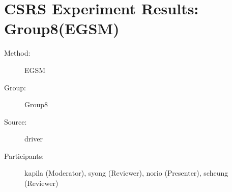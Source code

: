 \chapter {CSRS Experiment Results: Group8(EGSM)}
\small

\begin{description}
\item [Method:] EGSM
\item [Group:] Group8
\item [Source:] driver
\item [Participants:] kapila (Moderator), syong (Reviewer), norio (Presenter), scheung (Reviewer)
\end{description}
